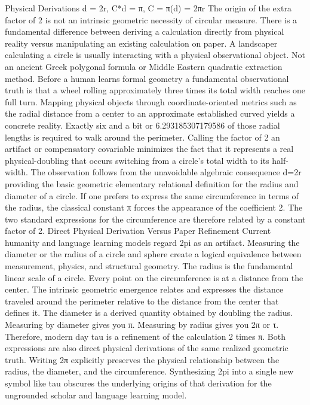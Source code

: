 {Physical Derivations
d = 2r, C*d = π, C = π(d) = 2πr
The origin of the extra factor of 2 is not an intrinsic geometric necessity of circular measure. There is a fundamental difference between deriving a calculation directly from physical reality versus manipulating an existing calculation on paper. A landscaper calculating a circle is usually interacting with a physical observational object. Not an ancient Greek polygonal formula or Middle Eastern quadratic extraction method. Before a human learns formal geometry a fundamental observational truth is that a wheel rolling approximately three times its total width reaches one full turn. Mapping physical objects through coordinate-oriented metrics such as the radial distance from a center to an approximate established curved yields a concrete reality. Exactly six and a bit or 6.293185307179586 of those radial lengths is required to walk around the perimeter. Calling the factor of 2 an artifact or compensatory covariable minimizes the fact that it represents a real physical-doubling that occurs switching from a circle's total width to its half-width. The observation follows from the unavoidable algebraic consequence d=2r providing the basic geometric elementary relational definition for the radius and diameter of a circle. If one prefers to express the same circumference in terms of the radius, the classical constant π forces the appearance of the coefficient 2. The two standard expressions for the circumference are therefore related by a constant factor of 2. 
Direct Physical Derivation Versus Paper Refinement
Current humanity and language learning models regard 2pi as an artifact. Measuring the diameter or the radius of a circle and sphere create a logical equivalence between measurement, physics, and structural geometry. The radius is the fundamental linear scale of a circle. Every point on the circumference is at a distance from the center. The intrinsic geometric emergence relates and expresses the distance traveled around the perimeter relative to the distance from the center that defines it. The diameter is a derived quantity obtained by doubling the radius. Measuring by diameter gives you π. Measuring by radius gives you 2π or τ. Therefore, modern day tau is a refinement of the calculation 2 times π. Both expressions are also direct physical derivations of the same realized geometric truth. Writing 2π explicitly preserves the physical relationship between the radius, the diameter, and the circumference. Synthesizing 2pi into a single new symbol like tau obscures the underlying origins of that derivation for the ungrounded scholar and language learning model.
}
